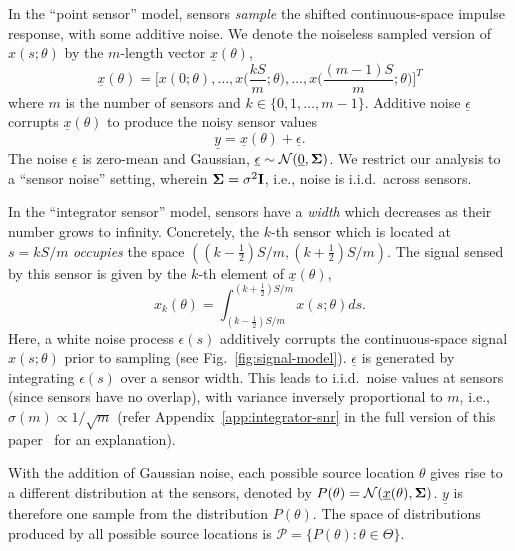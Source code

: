 \documentclass[conference]{IEEEtran}
\providecommand{\v}{}
\renewcommand{\v}[1]{\underline{#1}}
\providecommand{\m}{}
\renewcommand{\m}[1]{{\bf #1}}
\begin{document}
In the ``point sensor'' model, sensors \emph{sample} the shifted
continuous-space impulse response, with some additive noise. We denote the
noiseless sampled version of $x(s; \theta)$ by the $m$-length vector $\v
x(\theta)$,
\begin{equation} \label{eq:sampled-signal}
	\v x(\theta) = \bigg[x(0; \theta), \ldots, x\Big(\frac{kS}{m}; \theta\Big), \ldots, x\Big(\frac{(m{-}1)S}{m}; \theta\Big)\bigg]^T
\end{equation}
where $m$ is the number of sensors and $k \in \{0, 1, \ldots, m-1\}$. Additive
noise $\v \epsilon$ corrupts $\v x(\theta)$ to produce the noisy sensor values
\begin{equation} \label{eq:sensor-obs}
	\v y = \v x(\theta) + \v \epsilon.
\end{equation}
The noise $\v \epsilon$ is zero-mean and Gaussian, $\v \epsilon \sim
\mathcal{N}(\v 0, \m \Sigma)$. We restrict our analysis to a ``sensor noise''
setting, wherein $\m\Sigma = \sigma^2 \m I$, i.e., noise is i.i.d.\ across
sensors.

In the ``integrator sensor'' model, sensors have a \emph{width} which decreases
as their number grows to infinity. Concretely, the \mbox{$k$-th} sensor which
is located at $s = kS/m$ \emph{occupies} the space $((k{-}\frac{1}{2})S/m,
(k{+}\frac{1}{2})S/m)$.  The signal sensed by this sensor is given by the
$k$-th element of $\v x(\theta)$,
\begin{equation}
	x_k(\theta) = \int_{(k-\frac{1}{2})S/m}^{(k+\frac{1}{2})S/m} x(s;\theta) ds.
\end{equation}
Here, a white noise process $\epsilon(s)$ additively corrupts the
continuous-space signal $x(s;\theta)$ prior to sampling (see
Fig.~\ref{fig:signal-model}). $\v \epsilon$ is generated by integrating
$\epsilon(s)$ over a sensor width. This leads to i.i.d.\ noise values at
sensors (since sensors have no overlap), with variance inversely proportional
to $m$, i.e., $\sigma(m) \propto 1/\sqrt{m}$ (refer
Appendix~\ref{app:integrator-snr} in the full version of this
paper~\cite{FullVersion} for an explanation).

With the addition of Gaussian noise, each possible source location $\theta$
gives rise to a different distribution at the sensors, denoted by $P(\theta) =
\mathcal{N}(\v x(\theta), \m \Sigma)$. $\v y$ is therefore one sample from the
distribution $P(\theta)$. The space of distributions produced by all possible
source locations is $\mathcal{P} = \{P(\theta) : \theta \in \Theta \}$.
\end{document}
